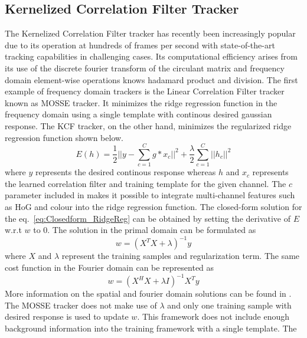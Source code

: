 \documentclass[10pt,twocolumn,letterpaper]{article}
\newcounter{ct}
\begin{document}
\subsection{Kernelized Correlation Filter Tracker} \label{KCF}
The Kernelized Correlation Filter tracker has recently been
increasingly popular due to its operation at hundreds of frames per
second with state-of-the-art tracking capabilities in challenging
cases. Its computational efficiency arises from its use of the
discrete fourier transform of the circulant matrix and frequency
domain element-wise operations knows hadamard product and
division. The first example of frequency domain trackers is the Linear
Correlation Filter tracker known as MOSSE tracker. It minimizes the
ridge regression function in the frequency domain using a single
template with continous desired gaussian response. The KCF tracker, on
the other hand, minimizes the regularized ridge regression function
shown below.
\begin{equation}
E(h) = \frac{1}{2}||y-\sum_{c=1}^{C}g*x_{c}||^{2} + \frac{\lambda}{2}\sum_{c=1}^{C}||h_{c}||^{2}
\label{eq:Closedform_RidgeReg}
\end{equation}
where $y$ represents the desired continous response whereas $h$ and
$x_{c}$ represents the learned correlation filter and training
template for the given channel. The $c$ parameter included in
\cite{henriques2015high,galoogahi2013multi} makes it possible to
integrate multi-channel features such as HoG and colour into the ridge
regression function. The closed-form solution for the
eq.~\ref{eq:Closedform_RidgeReg} can be obtained by setting the
derivative of $E$ w.r.t $w$ to $0$. The solution in the primal domain
can be formulated as
\begin{equation}
w = (X^{T}X+\lambda)^{-1}y
\label{eq:SpatialSolution}
\end{equation}
where $X$ and $\lambda$ represent the training samples and
regularization term. The same cost function in the Fourier domain can
be represented as
\begin{equation}
w = (X^{H}X+\lambda I)^{-1}X^{T}y
\label{eq:FourierSolution}
\end{equation}
More information on the spatial and fourier domain solutions can be
found in \cite{henriques2015high}. The MOSSE tracker does not make use
of $\lambda$ and only one training sample with desired response is
used to update $w$. This framework does not include enough background
information into the training framework with a single template. The
\end{document}
